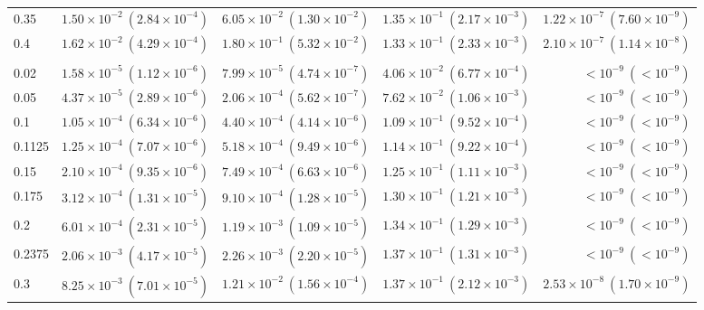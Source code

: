 \begin{table}[htbp]
\begin{tabular}{@{} l rrrr @{}}
0.35 & $1.50\!\times\!10^{-2}\ (2.84\!\times\!10^{-4})$ & $6.05\!\times\!10^{-2}\ (1.30\!\times\!10^{-2})$ & $1.35\!\times\!10^{-1}\ (2.17\!\times\!10^{-3})$ & $1.22\!\times\!10^{-7}\ (7.60\!\times\!10^{-9})$ \\
0.4 & $1.62\!\times\!10^{-2}\ (4.29\!\times\!10^{-4})$ & $1.80\!\times\!10^{-1}\ (5.32\!\times\!10^{-2})$ & $1.33\!\times\!10^{-1}\ (2.33\!\times\!10^{-3})$ & $2.10\!\times\!10^{-7}\ (1.14\!\times\!10^{-8})$ \\
\addlinespace
\multicolumn{5}{@{}l}{\textit{Wide ($p \sim \mathcal{U}(0.05, 0.3)$)}} \\
0.02 & $1.58\!\times\!10^{-5}\ (1.12\!\times\!10^{-6})$ & $7.99\!\times\!10^{-5}\ (4.74\!\times\!10^{-7})$ & $4.06\!\times\!10^{-2}\ (6.77\!\times\!10^{-4})$ & $<\!10^{-9}\ (<\!10^{-9})$ \\
0.05 & $4.37\!\times\!10^{-5}\ (2.89\!\times\!10^{-6})$ & $2.06\!\times\!10^{-4}\ (5.62\!\times\!10^{-7})$ & $7.62\!\times\!10^{-2}\ (1.06\!\times\!10^{-3})$ & $<\!10^{-9}\ (<\!10^{-9})$ \\
0.1 & $1.05\!\times\!10^{-4}\ (6.34\!\times\!10^{-6})$ & $4.40\!\times\!10^{-4}\ (4.14\!\times\!10^{-6})$ & $1.09\!\times\!10^{-1}\ (9.52\!\times\!10^{-4})$ & $<\!10^{-9}\ (<\!10^{-9})$ \\
0.1125 & $1.25\!\times\!10^{-4}\ (7.07\!\times\!10^{-6})$ & $5.18\!\times\!10^{-4}\ (9.49\!\times\!10^{-6})$ & $1.14\!\times\!10^{-1}\ (9.22\!\times\!10^{-4})$ & $<\!10^{-9}\ (<\!10^{-9})$ \\
0.15 & $2.10\!\times\!10^{-4}\ (9.35\!\times\!10^{-6})$ & $7.49\!\times\!10^{-4}\ (6.63\!\times\!10^{-6})$ & $1.25\!\times\!10^{-1}\ (1.11\!\times\!10^{-3})$ & $<\!10^{-9}\ (<\!10^{-9})$ \\
0.175 & $3.12\!\times\!10^{-4}\ (1.31\!\times\!10^{-5})$ & $9.10\!\times\!10^{-4}\ (1.28\!\times\!10^{-5})$ & $1.30\!\times\!10^{-1}\ (1.21\!\times\!10^{-3})$ & $<\!10^{-9}\ (<\!10^{-9})$ \\
0.2 & $6.01\!\times\!10^{-4}\ (2.31\!\times\!10^{-5})$ & $1.19\!\times\!10^{-3}\ (1.09\!\times\!10^{-5})$ & $1.34\!\times\!10^{-1}\ (1.29\!\times\!10^{-3})$ & $<\!10^{-9}\ (<\!10^{-9})$ \\
0.2375 & $2.06\!\times\!10^{-3}\ (4.17\!\times\!10^{-5})$ & $2.26\!\times\!10^{-3}\ (2.20\!\times\!10^{-5})$ & $1.37\!\times\!10^{-1}\ (1.31\!\times\!10^{-3})$ & $<\!10^{-9}\ (<\!10^{-9})$ \\
0.3 & $8.25\!\times\!10^{-3}\ (7.01\!\times\!10^{-5})$ & $1.21\!\times\!10^{-2}\ (1.56\!\times\!10^{-4})$ & $1.37\!\times\!10^{-1}\ (2.12\!\times\!10^{-3})$ & $2.53\!\times\!10^{-8}\ (1.70\!\times\!10^{-9})$ \\

\end{tabular}
\end{table}
